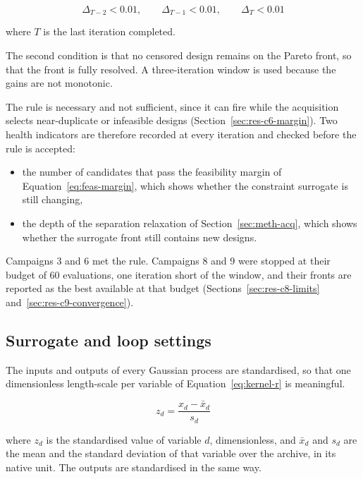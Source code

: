 \begin{equation}
\Delta_{T-2} < 0.01, \qquad \Delta_{T-1} < 0.01, \qquad \Delta_{T} < 0.01
\label{eq:hv-stop-cond}
\end{equation}

\noindent where $T$ is the last iteration completed.

The second condition is that no censored design remains on the Pareto
front, so that the front is fully resolved. A three-iteration window is
used because the gains are not monotonic.

The rule is necessary and not sufficient, since it can fire while the
acquisition selects near-duplicate or infeasible designs
(Section~\ref{sec:res-c6-margin}). Two health indicators are therefore recorded at every iteration and
checked before the rule is accepted:

\begin{itemize}
  \item the number of candidates that pass the feasibility margin of
        Equation~\eqref{eq:feas-margin}, which shows whether the
        constraint surrogate is still changing,

  \item the depth of the separation relaxation of
        Section~\ref{sec:meth-acq}, which shows whether the surrogate
        front still contains new designs.
\end{itemize}

Campaigns 3 and 6 met the rule. Campaigns 8 and 9 were stopped at
their budget of 60 evaluations, one iteration short of the window, and
their fronts are reported as the best available at that budget
(Sections~\ref{sec:res-c8-limits} and~\ref{sec:res-c9-convergence}).

\subsection{Surrogate and loop settings}
\label{sec:meth-loop-settings}

The inputs and outputs of every Gaussian process are standardised, so
that one dimensionless length-scale per variable of
Equation~\eqref{eq:kernel-r} is meaningful.

\begin{equation}
z_d = \frac{x_d - \bar{x}_d}{s_d}
\label{eq:standardise}
\end{equation}

\noindent where $z_d$ is the standardised value of variable $d$,
dimensionless, and $\bar{x}_d$ and $s_d$ are the mean and the standard
deviation of that variable over the archive, in its native unit. The
outputs are standardised in the same way.

